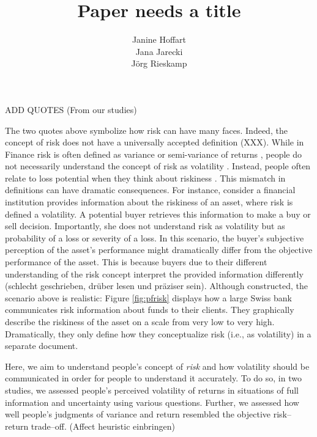 \documentclass[a4paper,doc, natbib]{apa6} %
\title{Paper needs a title}
\author{Janine Hoffart\\Jana Jarecki\\Jörg Rieskamp}
\affiliation{University of Basel}
\begin{document}
\maketitle

ADD QUOTES (From our studies)

The two quotes above symbolize how risk can have many faces. Indeed, the concept of risk does not have a universally accepted definition (XXX). While in Finance risk is often defined as variance or semi-variance of returns \citep{Markowitz1952, Markowitz1991, Markowitz1959}, people do not necessarily understand the concept of risk as volatility \citep{Mohr2010a}. Instead, people often relate to loss potential when they think about riskiness \citep{Duxbury2004, Sachse2012}. This mismatch in definitions can have dramatic consequences. For instance, consider a financial institution provides information about the riskiness of an asset, where risk is defined a volatility. A potential buyer retrieves this information to make a buy or sell decision. Importantly, she does not understand risk as volatility but as probability of a loss or severity of a loss. In this scenario, the buyer's subjective perception of the asset's performance might dramatically differ from the objective performance of the asset. This is because buyers due to their different understanding of the risk concept interpret the provided information differently (schlecht geschrieben, drüber lesen und präziser sein). Although constructed, the scenario above is realistic: Figure \ref{fig:pfrisk} displays how a large Swiss bank communicates risk information about funds to their clients. They graphically describe the riskiness of the asset on a scale from very low to very high. Dramatically, they only define how they conceptualize risk (i.e., as volatility) in a separate document. 


Here, we aim to understand people's concept of \textit{risk} and how volatility should be communicated in order for people to understand it accurately. To do so, in two studies, we assessed people's perceived volatility of returns in situations of full information and uncertainty using various questions. Further, we assessed how well people's judgments of variance and return resembled the objective risk--return trade--off. 
(Affect heuristic einbringen)
\end{document}
